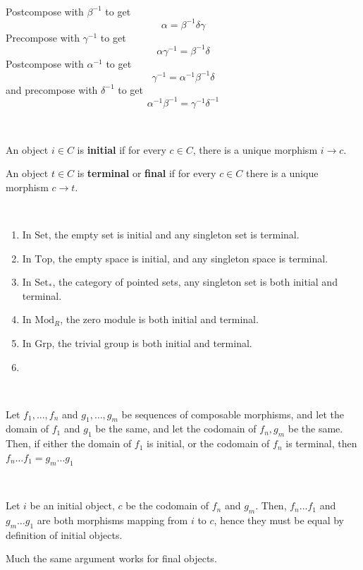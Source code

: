 \documentclass{article}
\begin{document}
\begin{customproof}
\

Postcompose with $\beta ^{-1}$ to get $$\alpha = \beta ^{-1} \delta \gamma$$Precompose with $\gamma ^{-1}$ to get $$\alpha \gamma ^{-1} = \beta ^{-1} \delta$$Postcompose with $\alpha ^{-1}$ to get $$\gamma ^{-1} = \alpha ^{-1} \beta ^{-1} \delta$$and precompose with $\delta ^{-1}$ to get $$\alpha ^{-1}\beta ^{-1} = \gamma ^{-1} \delta ^{-1}$$
\end{customproof}

\begin{definition}
\

An object $i \in C$ is \textbf{initial} if for every $c \in C$, there is a unique morphism $i \to c$. 

An object $t \in C$ is \textbf{terminal} or \textbf{final} if for every $c \in C$ there is a unique morphism $c \to t$.
\end{definition}

\begin{example}
\

\begin{enumerate}
    \item In $\text{Set}$, the empty set is initial and any singleton set is terminal.
    \item In $\text{Top}$, the empty space is initial, and any singleton space is terminal.
    \item In $\text{Set}_*$, the category of pointed sets, any singleton set is both initial and terminal.
    \item In $\text{Mod}_R$, the zero module is both initial and terminal.
    \item In $\text{Grp}$, the trivial group is both initial and terminal.
    \item 
\end{enumerate}
\end{example}

\begin{lemma}
\

Let $f_1, \dots, f_n$ and $g_1, \dots, g_m$ be sequences of composable morphisms, and let the domain of $f_1$ and $g_1$ be the same, and let the codomain of $f_n, g_m$ be the same. Then, if either the domain of $f_1$ is initial, or the codomain of $f_n$ is terminal, then $f_n \dots f_1 = g_m \dots g_1$
\end{lemma}

\begin{customproof}
\

Let $i$ be an initial object, $c$ be the codomain of $f_n$ and $g_m$. Then, $f_n \dots f_1$ and $g_m \dots g_1$ are both morphisms mapping from $i$ to $c$, hence they must be equal by definition of initial objects.

Much the same argument works for final objects.
\end{customproof}
\end{document}
